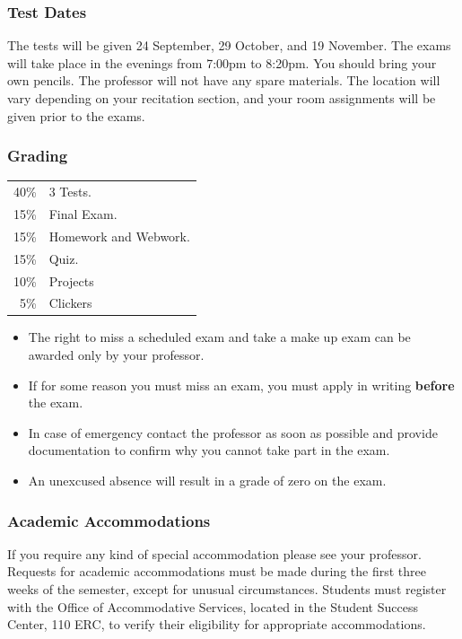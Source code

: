\begin{frame}
  \frametitle{Test Dates}

  The tests will be given 24 September, 29 October,
  and 19 November. The exams will take place in the evenings from
  7:00pm to 8:20pm. You should bring your own pencils.  The professor
  will not have any spare materials. The location will vary depending
  on your recitation section, and your room assignments will be given
  prior to the exams.
  
\end{frame}


\begin{frame}
  \frametitle{Grading}

   \begin{tabular}[t]{rl}
    40\% & 3 Tests. \\
    15\% & Final Exam. \\
    15\% & Homework and Webwork. \\
    15\% & Quiz. \\
    10\% & Projects\\
     5\% & Clickers
  \end{tabular}

  \begin{itemize}
  \item The right to miss a scheduled exam and take a make up exam can
    be awarded only by your professor.
  \item If for some reason you must miss an exam, you must apply in
    writing {\bf before} the exam.
  \item In case of emergency contact the professor as soon as possible
    and provide documentation to confirm why you cannot take part in
    the exam. 
  \item An unexcused absence will result in a grade of zero on the
    exam.
  \end{itemize}


  
\end{frame}


\begin{frame}
  \frametitle{Academic Accommodations}

  If you require any kind of special
  accommodation please see your professor.  Requests for academic
  accommodations must be made during the first three weeks of the
  semester, except for unusual circumstances.  Students must register
  with the Office of Accommodative Services, located in the Student
  Success Center, 110 ERC, to verify their eligibility for appropriate
  accommodations.
  
\end{frame}

